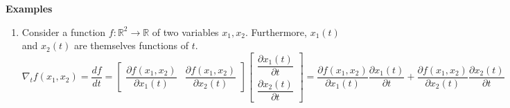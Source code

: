 \vspace{0.5cm}
\textbf{Examples}
\begin{enumerate}
    \item Consider a function $f : \mathbb{R}^2 \to \mathbb{R}$ of two variables $x_1, x_2$. 
    Furthermore, $x_1(t)$ and $x_2(t)$ are themselves functions of $t$. 
    \\
    $
        \nabla_t f(x_1, x_2)
        = \dfrac{df}{dt}
        = \begin{bmatrix}
            \dfrac{\partial f(x_1, x_2)}{\partial x_1(t)} &
            \dfrac{\partial f(x_1, x_2)}{\partial x_2(t)}
        \end{bmatrix}
        \begin{bmatrix}
            \dfrac{\partial x_1(t)}{\partial t} \\
            \dfrac{\partial x_2(t)}{\partial t}
        \end{bmatrix}
        = \dfrac{\partial f(x_1, x_2)}{\partial x_1(t)} \dfrac{\partial x_1(t)}{\partial t}
        + \dfrac{\partial f(x_1, x_2)}{\partial x_2(t)} \dfrac{\partial x_2(t)}{\partial t}
    $
    \hfill \cite{mfml/book/mml/Deisenroth-Faisal-Ong}


\end{enumerate}
